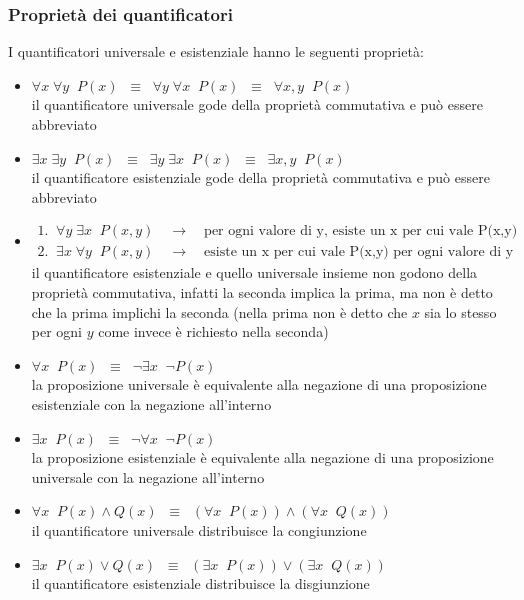 \subsubsection*{Proprietà dei quantificatori}
I quantificatori universale e esistenziale hanno le seguenti proprietà:
\begin{itemize}[itemsep=3pt]
	\item \(\forall x \; \forall y \;\; P(x) \;\; \equiv \;\; \forall y \; \forall x \;\;P(x) \;\; \equiv \;\; \forall x, y \;\;P(x)\) \\
	il quantificatore universale gode della proprietà commutativa e può essere abbreviato
	\item \(\exists x \; \exists y \;\; P(x) \;\; \equiv \;\; \exists y \; \exists x \;\;P(x) \;\; \equiv \;\; \exists x, y \;\;P(x)\) \\
	il quantificatore esistenziale gode della proprietà commutativa e può essere abbreviato
	\item \(\begin{array}{l}
		1. \;\; \forall y \; \exists x \;\; P(x, y) \quad \rightarrow \quad \text{per ogni valore di y, esiste un x per cui vale P(x,y)}  \\
		2. \;\; \exists x \; \forall y \;\; P(x, y) \quad \rightarrow \quad \text{esiste un x per cui vale P(x,y) per ogni valore di y}
	\end{array}\) \\
	il quantificatore esistenziale e quello universale insieme non godono della proprietà commutativa, infatti la seconda implica
	la prima, ma non è detto che la prima implichi la seconda (nella prima non è detto che \(x\) sia lo stesso per ogni \(y\) come
	invece è richiesto nella seconda)
	\item \(\forall x \;\; P(x) \;\; \equiv \;\; \neg \exists x \;\; \neg P(x)\) \\
	la proposizione universale è equivalente alla negazione di una proposizione esistenziale con la negazione all'interno
	\item \(\exists x \;\; P(x) \;\; \equiv \;\; \neg \forall x \;\; \neg P(x)\) \\
	la proposizione esistenziale è equivalente alla negazione di una proposizione universale con la negazione all'interno
	\item \(\forall x \;\; P(x) \land Q(x) \;\; \equiv \;\; (\forall x \;\; P(x)) \land (\forall x \;\; Q(x))\) \\
	il quantificatore universale distribuisce la congiunzione
	\item \(\exists x \;\; P(x) \lor Q(x) \;\; \equiv \;\; (\exists x \;\; P(x)) \lor (\exists x \;\; Q(x))\) \\
	il quantificatore esistenziale distribuisce la disgiunzione
\end{itemize}

